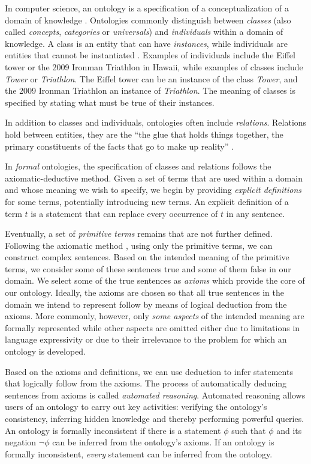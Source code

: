 \documentclass[12pt]{article}
\renewcommand{\cite}{\citep}
\begin{document}
In computer science, an ontology is a specification of a
conceptualization of a domain of knowledge \cite{Gruber1995,
  Guarino1998}.  Ontologies commonly distinguish between {\em classes}
(also called {\em concepts}, {\em categories} or {\em universals}) and
{\em individuals} within a domain of knowledge. A class is an entity
that can have {\em instances}, while individuals are entities that
cannot be instantiated \cite{Herre2006}. Examples of individuals
include the Eiffel tower or the 2009 Ironman Triathlon in Hawaii,
while examples of classes include {\em Tower} or {\em Triathlon}. The
Eiffel tower can be an instance of the class {\em Tower}, and the 2009
Ironman Triathlon an instance of {\em Triathlon}.  The meaning of
classes is specified by stating what must be true of their instances.

In addition to classes and individuals, ontologies often include {\em
  relations}. Relations hold between entities, they are the ``the glue
that holds things together, the primary constituents of the facts that
go to make up reality'' \cite{Barwise1989}.

In {\em formal} ontologies, the specification of classes and relations
follows the axiomatic-deductive method. Given a set of terms that are
used within a domain and whose meaning we wish to specify, we begin by
providing {\em explicit definitions} for some terms, potentially
introducing new terms. An explicit definition of a term $t$ is a
statement that can replace every occurrence of $t$ in any sentence.

Eventually, a set of {\em primitive terms} remains that are not
further defined. Following the axiomatic method \cite{Hilbert1918},
using only the primitive terms, we can construct complex
sentences. Based on the intended meaning of the primitive terms, we
consider some of these sentences true and some of them false in our
domain. We select some of the true sentences as {\em axioms} which
provide the core of our ontology. Ideally, the axioms are chosen so
that all true sentences in the domain we intend to represent follow by
means of logical deduction from the axioms. More commonly, however,
only {\em some aspects} of the intended meaning are formally
represented while other aspects are omitted either due to limitations
in language expressivity or due to their irrelevance to the problem
for which an ontology is developed.

Based on the axioms and definitions, we can use deduction to infer
statements that logically follow from the axioms.  The process of
automatically deducing sentences from axioms is called {\em automated
  reasoning}. Automated reasoning allows users of an ontology to carry
out key activities: verifying the ontology's consistency, inferring
hidden knowledge and thereby performing powerful queries.  An ontology
is formally inconsistent if there is a statement $\phi$ such that
$\phi$ and its negation $\neg \phi$ can be inferred from the
ontology's axioms.  If an ontology is formally inconsistent, {\em
  every} statement can be inferred from the ontology.  
\end{document}
